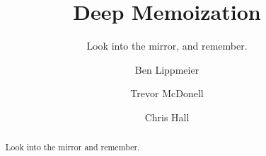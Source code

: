 \documentclass[acmsmall]{acmart}
\begin{document}
\title{Deep Memoization}
\subtitle{Look into the mirror, and remember.}

\author{Ben Lippmeier}

\author{Trevor McDonell}

\author{Chris Hall}

\begin{abstract}
Look into the mirror and remember.
\end{abstract}

\maketitle
\makeatactive







\end{document}
